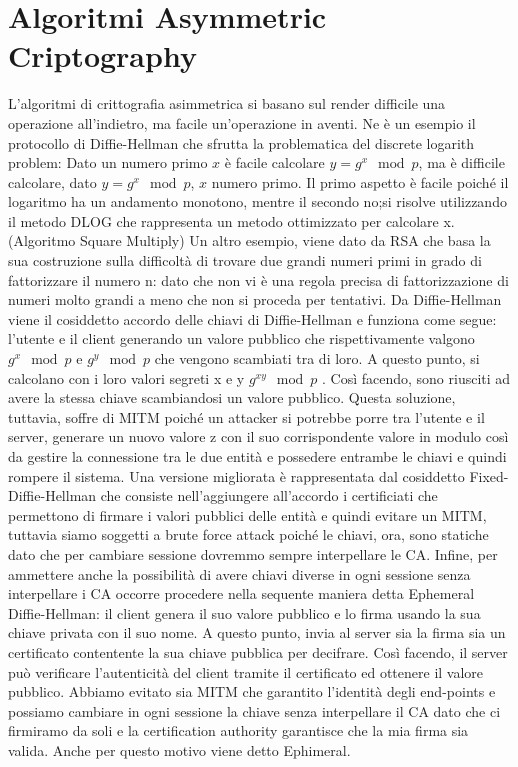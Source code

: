 \documentclass[a4paper,draft]{article}
\begin{document}
\section{Algoritmi Asymmetric Criptography}
L'algoritmi di crittografia asimmetrica si basano sul render difficile una operazione all'indietro, ma facile un'operazione in aventi\@.
Ne è un esempio il protocollo di Diffie-Hellman che sfrutta la problematica del discrete logarith problem: Dato un numero primo \(x\) è facile calcolare \(y=g^x\mod{p}\), ma è difficile calcolare, dato \(y=g^x\mod{p}\), \(x\) numero primo\@. Il primo aspetto è facile poiché il logaritmo ha un andamento monotono, mentre il secondo no;\@quindi si risolve utilizzando il metodo DLOG che rappresenta un metodo ottimizzato per calcolare x\@. (Algoritmo Square Multiply)\newline
Un altro esempio, viene dato da RSA che basa la sua costruzione sulla difficoltà di trovare due grandi numeri primi in grado di fattorizzare il numero n: dato che non vi è una regola precisa di fattorizzazione di numeri molto grandi a meno che non si proceda per tentativi\@.\newline
Da Diffie-Hellman viene il cosiddetto accordo delle chiavi di Diffie-Hellman e funziona come segue: l'utente e il client generando un valore pubblico che rispettivamente valgono \(g^x\mod{p}\) e \(g^y\mod{p}\) che vengono scambiati tra di loro\@. A questo punto, si calcolano con i loro valori segreti x e y \(g^{xy}\mod{p}\) \@. Così facendo, sono riusciti ad avere la stessa chiave scambiandosi un valore pubblico\@.\newline
Questa soluzione, tuttavia, soffre di MITM poiché un attacker si potrebbe porre tra l'utente e il server, generare un nuovo valore z con il suo corrispondente valore in modulo così da gestire la connessione tra le due entità e possedere entrambe le chiavi e quindi rompere il sistema\@.
 Una versione migliorata è rappresentata dal cosiddetto Fixed-Diffie-Hellman che consiste nell'aggiungere all'accordo i certificiati che permettono di firmare i valori pubblici delle entità e quindi evitare un MITM, tuttavia siamo soggetti a brute force attack poiché le chiavi, ora, sono statiche dato che per cambiare sessione dovremmo sempre interpellare le CA\@.\newline
Infine, per ammettere anche la possibilità di avere chiavi diverse in ogni sessione senza interpellare i CA occorre procedere nella sequente maniera detta Ephemeral Diffie-Hellman: il client genera il suo valore pubblico e lo firma usando la sua chiave privata con il suo nome\@. A questo punto, invia al server sia la firma sia un certificato contentente la sua chiave pubblica per decifrare\@. Così facendo, il server può verificare l'autenticità del client tramite il certificato ed ottenere il valore pubblico\@.\newline
Abbiamo evitato sia MITM che garantito l'identità degli end-points e possiamo cambiare in ogni sessione la chiave senza interpellare il CA dato che ci firmiramo da soli e la certification authority garantisce che la mia firma sia valida\@. Anche per questo motivo viene detto Ephimeral\@.
\end{document}
